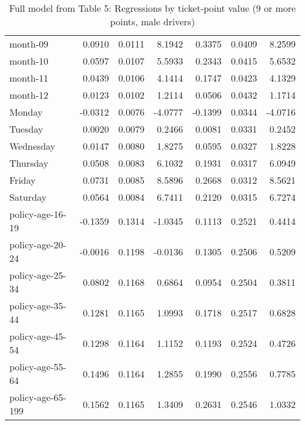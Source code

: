 \documentclass[10pt]{article}
\begin{document}
\begin{table}[ht]
\begin{tabular}{lrrrrrr}
  month-09 & 0.0910 & 0.0111 & 8.1942 & 0.3375 & 0.0409 & 8.2599 \\ 
  month-10 & 0.0597 & 0.0107 & 5.5933 & 0.2343 & 0.0415 & 5.6532 \\ 
  month-11 & 0.0439 & 0.0106 & 4.1414 & 0.1747 & 0.0423 & 4.1329 \\ 
  month-12 & 0.0123 & 0.0102 & 1.2114 & 0.0506 & 0.0432 & 1.1714 \\ 
  Monday & -0.0312 & 0.0076 & -4.0777 & -0.1399 & 0.0344 & -4.0716 \\ 
  Tuesday & 0.0020 & 0.0079 & 0.2466 & 0.0081 & 0.0331 & 0.2452 \\ 
  Wednesday & 0.0147 & 0.0080 & 1.8275 & 0.0595 & 0.0327 & 1.8228 \\ 
  Thursday & 0.0508 & 0.0083 & 6.1032 & 0.1931 & 0.0317 & 6.0949 \\ 
  Friday & 0.0731 & 0.0085 & 8.5896 & 0.2668 & 0.0312 & 8.5621 \\ 
  Saturday & 0.0564 & 0.0084 & 6.7411 & 0.2120 & 0.0315 & 6.7274 \\ 
  policy-age-16-19 & -0.1359 & 0.1314 & -1.0345 & 0.1113 & 0.2521 & 0.4414 \\ 
  policy-age-20-24 & -0.0016 & 0.1198 & -0.0136 & 0.1305 & 0.2506 & 0.5209 \\ 
  policy-age-25-34 & 0.0802 & 0.1168 & 0.6864 & 0.0954 & 0.2504 & 0.3811 \\ 
  policy-age-35-44 & 0.1281 & 0.1165 & 1.0993 & 0.1718 & 0.2517 & 0.6828 \\ 
  policy-age-45-54 & 0.1298 & 0.1164 & 1.1152 & 0.1193 & 0.2524 & 0.4726 \\ 
  policy-age-55-64 & 0.1496 & 0.1164 & 1.2855 & 0.1990 & 0.2556 & 0.7785 \\ 
  policy-age-65-199 & 0.1562 & 0.1165 & 1.3409 & 0.2631 & 0.2546 & 1.0332 \\ 
   \hline
\end{tabular}
\caption{Full model from Table 5: Regressions by ticket-point value (9 or more points, male drivers)} 
\label{tab_5_9plus_pts_M}
\end{table}


\clearpage
\pagebreak



\end{document}
